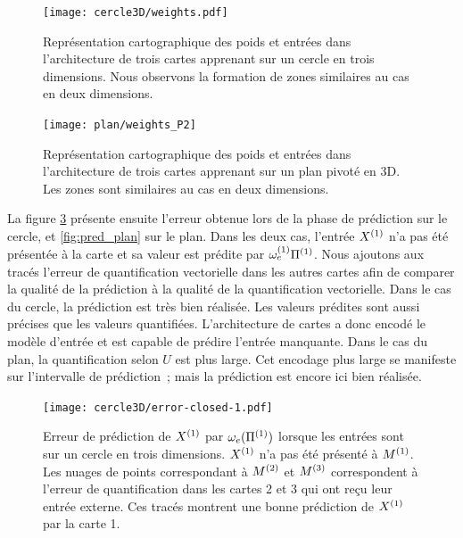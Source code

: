 \documentclass[../main]{subfiles}
\begin{document}
\begin{figure}[h!]
	\centering\texttt{[image: cercle3D/weights.pdf]}
	\caption{Représentation cartographique des poids et entrées dans l'architecture de trois cartes apprenant sur un cercle en trois dimensions. Nous observons la formation de zones similaires au cas en deux dimensions. \label{fig:w_cercle}}
\end{figure}

\begin{figure}[h!]
	\centering\texttt{[image: plan/weights\_P2]}
	\caption{Représentation cartographique des poids et entrées dans l'architecture de trois cartes apprenant sur un plan pivoté en 3D. Les zones sont similaires au cas en deux dimensions. \label{fig:w_plan3}}
\end{figure}


La figure \ref{fig:pred_cercle} présente ensuite l'erreur obtenue lors de la phase de prédiction sur le cercle, et \ref{fig:pred_plan} sur le plan.
Dans les deux cas, l'entrée $X^{({1})}$ n'a pas été présentée à la carte et sa valeur est prédite par $\omega_{e}^{({1})}{\Pi^{({1})}}$. 
Nous ajoutons aux tracés l'erreur de quantification vectorielle dans les autres cartes afin de comparer la qualité de la prédiction à la qualité de la quantification vectorielle.
Dans le cas du cercle, la prédiction est très bien réalisée. Les valeurs prédites sont aussi précises que les valeurs quantifiées. 
L'architecture de cartes a donc encodé le modèle d'entrée et est capable de prédire l'entrée manquante.
Dans le cas du plan, la quantification selon $U$ est plus large. 
Cet encodage plus large se manifeste sur l'intervalle de prédiction~; mais la prédiction est encore ici bien réalisée. 

\begin{figure}
	\texttt{[image: cercle3D/error-closed-1.pdf]}
	\caption{Erreur de prédiction de $X^{({1})}$ par $\omega_e(\Pi^{({1})})$ lorsque les entrées sont sur un cercle en trois dimensions. $X^{({1})}$ n'a pas été présenté à $M^{({1})}$.
	 Les nuages de points correspondant à $M^{({2})}$ et $M^{({3})}$ correspondent à l'erreur de quantification dans les cartes 2 et 3 qui ont reçu leur entrée externe. Ces tracés montrent une bonne prédiction de $X^{({1})}$ par la carte 1. \label{fig:pred_cercle}}
\end{figure}
\end{document}
